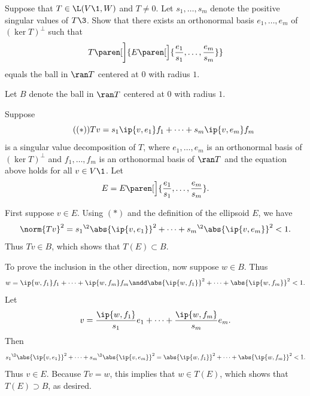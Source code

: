 \exercise
Suppose that $T \in \L(V\1,W)$ and $T \ne 0$. Let $s_1, \ldots, s_m$ denote the positive singular values of $T\3$. Show that there exists an orthonormal basis $e_1, \ldots, e_m$ of $(\ker T)^\perp$ such that
\[
T\paren[\bigg]{ E\paren[\Big]{ \frac{e_1}{s_1}, \ldots, \frac{e_m}{s_m} } }
\]
equals the ball in $\ran T$ centered at $0$ with radius $1$.

\begin{Solution}
Let $B$ denote the ball in $\ran T$ centered at $0$ with radius $1$.

Suppose
\[  \tag{$(*)$}
Tv = s_1 \ip{v, e_1} f_1 + \cdots + s_m \ip{v, e_m} f_m
\]
is a singular value decomposition of $T$, where $e_1, \ldots, e_m$ is an orthonormal basis of $(\ker T)^\perp$ and $f_1, \ldots, f_m$ is an orthonormal basis of $\ran T$ and the equation above holds for all $v \in V\1$. Let
\[
E = E\paren[\Big]{ \frac{e_1}{s_1}, \ldots, \frac{e_m}{s_m} }.
\]

First suppose $v \in E$. Using $(*)$ and the definition of the ellipsoid $E$, we have
\[
\norm{Tv}^2 = {s_1}^{\2} \abs{\ip{v, e_1}}^2 + \cdots + {s_m}^{\2} \abs{\ip{v, e_m}}^2 < 1.
\]
Thus $Tv \in B$, which shows that $T(E) \subset B$.

To prove the inclusion in the other direction, now suppose $w \in B$. Thus
\[
w = \ip{w, f_1}f_1 + \cdots + \ip{w, f_m}f_m \andd \abs{\ip{w, f_1}}^2 + \cdots + \abs{\ip{w, f_m}}^2 < 1.
\]
Let
\[
v = \frac{\ip{w,f_1}}{s_1} e_1  + \cdots +  \frac{\ip{w,f_m}}{s_m} e_m.
\]
Then
\[
{s_1}^{\2} \abs{\ip{v, e_1}}^2 + \cdots + {s_m}^{\2} \abs{\ip{v, e_m}}^2
= \abs{\ip{w, f_1}}^2 + \cdots + \abs{\ip{w, f_m}}^2 <1.
\]
Thus $v \in E$. Because $Tv = w$, this implies that $w \in T(E)$, which shows that $T(E) \supset B$, as desired.
\end{Solution}

